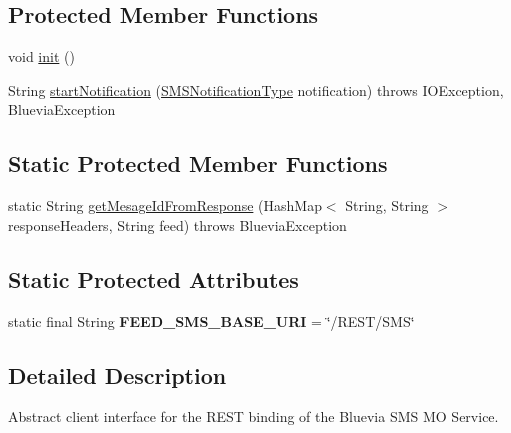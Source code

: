 \subsection*{Protected Member Functions}
\begin{DoxyCompactItemize}
\item 
void \hyperlink{classcom_1_1bluevia_1_1messagery_1_1mo_1_1sms_1_1client_1_1BVMoSmsClient_a305d6c3b63ad89bc45209422a2c15a90}{init} ()
\item 
String \hyperlink{classcom_1_1bluevia_1_1messagery_1_1mo_1_1sms_1_1client_1_1BVMoSmsClient_af13484824957aeb228c4addbd8ba8364}{startNotification} (\hyperlink{classcom_1_1telefonica_1_1schemas_1_1unica_1_1rest_1_1sms_1_1v1_1_1SMSNotificationType}{SMSNotificationType} notification)  throws IOException, BlueviaException
\end{DoxyCompactItemize}
\subsection*{Static Protected Member Functions}
\begin{DoxyCompactItemize}
\item 
static String \hyperlink{classcom_1_1bluevia_1_1messagery_1_1mo_1_1sms_1_1client_1_1BVMoSmsClient_a0d299eda99452f1ddf51e235cf7d9bce}{getMesageIdFromResponse} (HashMap$<$ String, String $>$ responseHeaders, String feed)  throws BlueviaException
\end{DoxyCompactItemize}
\subsection*{Static Protected Attributes}
\begin{DoxyCompactItemize}
\item 
\hypertarget{classcom_1_1bluevia_1_1messagery_1_1mo_1_1sms_1_1client_1_1BVMoSmsClient_a181347faf92bc775e1077cfdf69bb66f}{
static final String {\bfseries FEED\_\-SMS\_\-BASE\_\-URI} = \char`\"{}/REST/SMS\char`\"{}}
\label{classcom_1_1bluevia_1_1messagery_1_1mo_1_1sms_1_1client_1_1BVMoSmsClient_a181347faf92bc775e1077cfdf69bb66f}

\end{DoxyCompactItemize}


\subsection{Detailed Description}
Abstract client interface for the REST binding of the Bluevia SMS MO Service.

